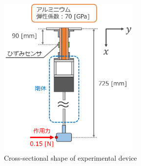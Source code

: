 \documentclass[twocolumn,a4j]{jsarticle}
\begin{document}
\begin{figure}[htbp]
    \footnotesize
    \begin{center}
        \includegraphics[width=70mm]{../../2111/images/moment.png}
        \caption{Cross-sectional shape of experimental device}
    \end{center}
\end{figure}

\newpage
\end{document}
